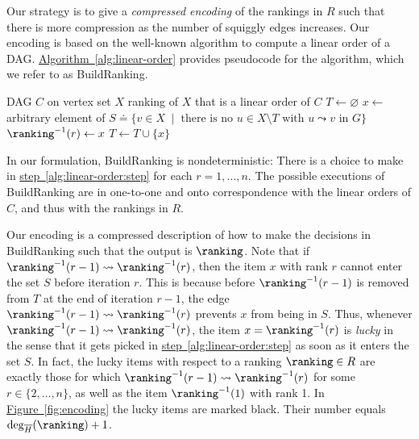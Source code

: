 \documentclass[11pt]{article}
\numberwithin{equation}{section}
\theoremstyle{definition}
\theoremstyle{plain}
\newcommand{\expref}[2]{\hyperref[#2]{#1~\ref{#2}}}
\begin{document}
Our strategy is to give a \emph{compressed encoding} of the rankings in $R$ such that there is more compression as the number of squiggly edges increases. Our encoding is based on the well-known algorithm to compute a linear order of a DAG. \expref{Algorithm}{alg:linear-order} provides pseudocode for
the algorithm, which we refer to as BuildRanking.

\begin{algorithm}[ht]
  \caption{BuildRanking$(C)$}\label{alg:linear-order}
  \begin{algorithmic}[1]
    \Require DAG $C$ on vertex set $X$
    \Ensure ranking of $X$ that is a linear order of $C$
    \State $T \gets \varnothing$
      \State \label{alg:linear-order:step}%
      $x \gets$ arbitrary element of $S \doteq  \{ v \in X \;\mid\; \text{there is no } u \in X \setminus T \text{ with } u \leadsto v \text{ in } G \}$
      \State $\ranking^{-1}(r) \gets x$ 
      \State $T \gets T \cup \{x\}$
    \EndFor
  \end{algorithmic}
\end{algorithm}

In our formulation, BuildRanking is nondeterministic: There is a choice to make in \expref{step}{alg:linear-order:step} for each $r=1,\dots,n$. The possible executions of BuildRanking are in one-to-one and onto correspondence with the linear orders of $C$, and thus with the rankings in $R$. 

Our encoding is a compressed description of how to make the decisions in BuildRanking such that the output is $\ranking$. Note that if $\ranking^{-1}(r-1) \leadsto \ranking^{-1}(r)$, then the item $x$ with rank $r$ cannot enter the set $S$ before iteration $r$. This is because before $\ranking^{-1}(r-1)$ is removed from $T$ at the end of iteration $r-1$, the edge $\ranking^{-1}(r-1) \leadsto \ranking^{-1}(r)$ prevents $x$ from being in $S$. Thus, whenever $\ranking^{-1}(r-1) \leadsto \ranking^{-1}(r)$, the item $x=\ranking^{-1}(r)$ is \emph{lucky} in the sense that it gets picked in \expref{step}{alg:linear-order:step} as soon as it enters the set $S$. In fact, the lucky items with respect to a ranking $\ranking \in R$ are exactly those for which $\ranking^{-1}(r-1) \leadsto \ranking^{-1}(r)$ for some $r \in \{2,\dots,n\}$, as well as the item $\ranking^{-1}(1)$ with rank 1. In \expref{Figure}{fig:encoding} the lucky items are marked black. Their number equals $\deg_{\overline{H}}(\ranking)+1$. 
\end{document}
